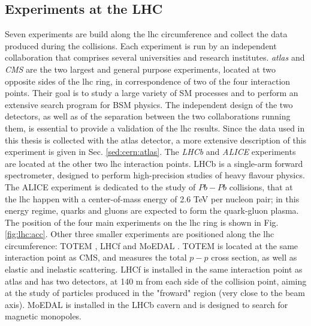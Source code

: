 \subsection{Experiments at the LHC}

Seven experiments are build along the \gls{lhc} circumference and collect the data produced during the collisions. Each experiment is run by an independent collaboration that comprises several universities and research institutes. 
\textit{\gls{atlas}} \cite{atlas:atlas} and \textit{CMS} \cite{cms:cms} are the two largest and general purpose experiments, located at two opposite sides of the \gls{lhc} ring, in correspondence of two of the four interaction points. Their goal is to study a large variety of SM processes and to perform an extensive search program for BSM physics. The independent design of the two detectors, as well as of the separation between the two collaborations running them, is essential to provide a validation of the \gls{lhc} results. Since the data used in this thesis is collected with the \gls{atlas} detector, a more extensive description of this experiment is given in Sec. \ref{sed:cern:atlas}. 
The \textit{LHCb} \cite{lhcb:lhcb} and \textit{ALICE} \cite{alice:alice} experiments are located at the other two \gls{lhc} interaction points. LHCb is a single-arm forward spectrometer, designed to perform high-precision studies of heavy flavour physics. The ALICE experiment is dedicated to the study of $Pb-Pb$ collisions, that at the \gls{lhc} happen with a center-of-mass energy of 2.6 TeV per nucleon pair; in this energy regime, quarks and gluons are expected to form the quark-gluon plasma.
The position of the four main experiments on the \gls{lhc} ring is shown in Fig. \ref{fig:lhc:acc}.
Other three smaller experiments are positioned along the \gls{lhc} circumference: TOTEM \cite{totem:totem}, LHCf \cite{lhcf:lhcf} and MoEDAL \cite{moedal:moedal}. TOTEM is located at the same interaction point as CMS, and measures the total $p-p$ cross section, as well as elastic and inelastic scattering. LHCf is installed in the same interaction point as \gls{atlas} and has two detectors, at 140 m from each side of the collision point, aiming at the study of particles produced in the "froward" region (very close to the beam axis). MoEDAL is installed in the LHCb cavern and is designed to search for magnetic monopoles.  





